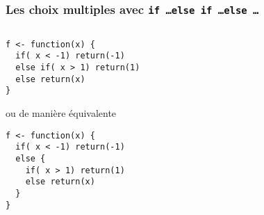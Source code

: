 \documentclass[10pt]{beamer}
\begin{document}
\begin{frame}[fragile]
  \frametitle{Les choix multiples avec \texttt{if \dots else if \dots else \dots}}
  
\begin{columns}[c]
\begin{column}{0.48\textwidth}
  \begin{lstlisting}[style=editor]
f <- function(x) {
  if( x < -1) return(-1)
  else if( x > 1) return(1)
  else return(x)
}   
\end{lstlisting}

ou de manière équivalente
\begin{lstlisting}[style=editor]
f <- function(x) {
  if( x < -1) return(-1)
  else {
    if( x > 1) return(1)
    else return(x)
  }
}
\end{lstlisting}
\end{column}
\begin{column}{0.48\textwidth}
\end{column}
\end{columns}
\end{frame}
\end{document}
